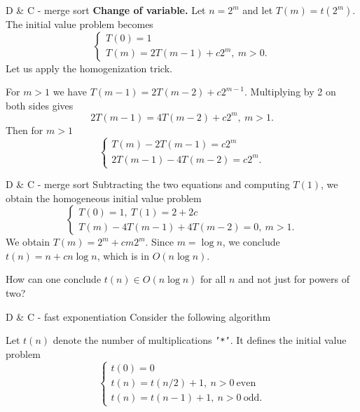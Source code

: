 \documentclass{beamer}
\begin{document}
%

\begin{frame}{D \& C - merge sort}
	\textbf{Change of variable.} Let $n= 2^m$ and let $T(m)= t(2^m)$.
	The initial value problem becomes
	\[
		\begin{cases}
			T(0)= 1\\
			T(m)= 2T(m-1) + c2^m,\ m > 0.
		\end{cases}
	\]
	Let us apply the homogenization trick.

	\bigskip
	For $m > 1$ we have $T(m-1) = 2T(m-2) + c2^{m-1}$. Multiplying by 2 on
	both sides gives
	\[
		2T(m-1) = 4T(m-2) + c2^m,\ m > 1.
	\]
	Then for $m > 1$
	\[
		\begin{cases}
			T(m) - 2T(m-1) = c2^m\\
			2T(m-1) - 4T(m-2) = c2^m.
		\end{cases}
	\]
\end{frame}

%

\begin{frame}{D \& C - merge sort}
	Subtracting the two equations and computing $T(1)$, we obtain the homogeneous
	initial value problem
	\[
		\begin{cases}
			T(0)= 1,\ T(1)= 2 + 2c\\
			T(m) - 4T(m-1) + 4T(m-2)= 0,\ m > 1.
		\end{cases}
	\]
	We obtain $T(m) = 2^m + cm2^m$. Since $m = \log n$, we conclude
	$t(n) = n + cn\log n$, which is in $O(n\log n)$.

	\begin{qtn}
		How can one conclude $t(n) \in O(n\log n)$ for all $n$ and not
		just for powers of two?
	\end{qtn}
\end{frame}

%

\begin{frame}{D \& C - fast exponentiation}
	Consider the following algorithm
	
	

	Let $t(n)$ denote the number of multiplications \texttt{'*'}. It defines the
	initial value problem
	\[
		\begin{cases}
			t(0)= 0\\
			t(n)= t(n/2) + 1,\ n > 0\ \text{even}\\
			t(n)= t(n-1) + 1,\ n > 0\ \text{odd}.
		\end{cases}
	\]
\end{frame}
\end{document}
